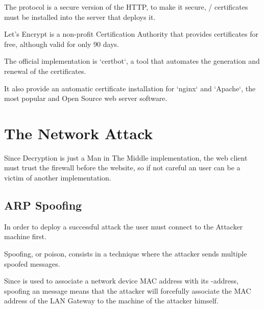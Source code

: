 The  protocol is a secure version of the HTTP, to make it secure, / certificates must be installed into the server that deploys it.

Let's Encrypt is a non-profit Certification Authority that provides  certificates for free, although valid for only 90 days.

The official implementation is `certbot`, a tool that automates the generation and renewal of the certificates.

It also provide an automatic certificate installation for `nginx` and `Apache`, the most popular and Open Source web server software.

\section{The Network Attack}

Since  Decryption is just a Man in The Middle implementation, the web client must trust the firewall before the website, so if not careful an user can be a victim of another  implementation.

\newpage

\subsection{ARP Spoofing}

In order to deploy a successful  attack the user must connect to the Attacker machine first.

 Spoofing, or  poison, consists in a technique where the attacker sends multiple spoofed  messages.

Since  is used to associate a network device MAC address with its -address, spoofing an  message means that the attacker will forcefully associate the MAC address of the LAN Gateway to the machine of the attacker himself.

